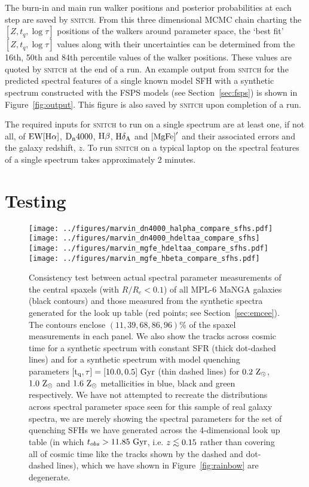 \documentclass[useAMS,usenatbib]{mn2e}
\def\lesssim{\mathrel{\hbox{\rlap{\hbox{\lower3pt\hbox{$\sim$}}}\hbox{\raise2pt\hbox{$<$}}}}}
\begin{document}
The burn-in and main run walker positions and posterior probabilities at each step are saved by \textsc{snitch}. From this three dimensional MCMC chain charting the $[Z, t_q, \log \tau]$ positions of the walkers around parameter space, the `best fit' $[Z, t_q, \log \tau]$ values along with their uncertainties can be determined from the 16th, 50th and 84th percentile values of the walker positions. These values are quoted by \textsc{snitch} at the end of a run. An example output from \textsc{snitch} for the predicted spectral features of a single known model SFH with a synthetic spectrum constructed with the FSPS models (see Section~\ref{sec:fsps}) is shown in Figure~\ref{fig:output}. This figure is also saved by \textsc{snitch} upon completion of a run.  


The required inputs for \textsc{snitch} to run on a single spectrum are at least one, if not all, of $\rm{EW}[H\alpha]$, $\rm{D}_n4000$, $\rm{H}\beta$, $\rm{H}\delta_A$ and $\rm{[MgFe]}^{\prime}$ and their associated errors and the galaxy redshift, $z$. To run \textsc{snitch} on a typical laptop on the spectral features of a single spectrum takes approximately 2 minutes. 

\section{Testing}\label{sec:test}

\begin{figure*}
\centering
\texttt{[image: ../figures/marvin\_dn4000\_halpha\_compare\_sfhs.pdf]}
\texttt{[image: ../figures/marvin\_dn4000\_hdeltaa\_compare\_sfhs]}
\texttt{[image: ../figures/marvin\_mgfe\_hdeltaa\_compare\_sfhs.pdf]}
\texttt{[image: ../figures/marvin\_mgfe\_hbeta\_compare\_sfhs.pdf]}
\caption{Consistency test between actual spectral parameter measurements of the central spaxels (with $R/R_e < 0.1$) of all MPL-6 MaNGA galaxies (black contours) and those measured from the synthetic spectra generated for the look up table (red points; see Section~\ref{sec:emcee}). The contours enclose $(11, 39, 68, 86, 96)\%$ of the spaxel measurements in each panel. We also show the tracks across cosmic time for a synthetic spectrum with constant SFR (thick dot-dashed lines) and for a synthetic spectrum with model quenching parameters $[\rm{t}_q, \tau] = [10.0, 0.5]~\rm{Gyr}$ (thin dashed lines) for $0.2~\rm{Z}_{\odot}$, $1.0~\rm{Z}_{\odot}$ and $1.6~\rm{Z}_{\odot}$ metallicities in blue, black and green respectively. We have not attempted to recreate the distributions across spectral parameter space seen for this sample of real galaxy spectra, we are merely showing the spectral parameters for the set of quenching SFHs we have generated across the 4-dimensional look up table (in which $t_{obs} > 11.85~\rm{Gyr}$, i.e. $z \lesssim 0.15$ rather than covering all of cosmic time like the tracks shown by the dashed and dot-dashed lines), which we have shown in Figure~\ref{fig:rainbow} are degenerate.}
\label{fig:compare_manga_specmeas}
\end{figure*}
\end{document}
